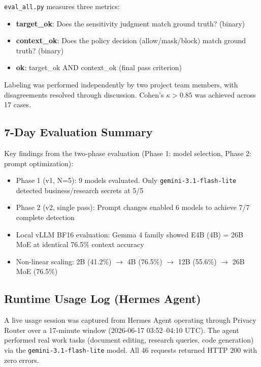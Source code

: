 \documentclass[11pt,a4paper]{article}
\begin{document}
\texttt{eval\_all.py} measures three metrics:

\begin{itemize}[nosep]
  \item \textbf{target\_ok}: Does the sensitivity judgment match ground truth? (binary)
  \item \textbf{context\_ok}: Does the policy decision (allow/mask/block) match ground truth? (binary)
  \item \textbf{ok}: target\_ok AND context\_ok (final pass criterion)
\end{itemize}

Labeling was performed independently by two project team members, with disagreements resolved through discussion. Cohen's $\kappa > 0.85$ was achieved across 17 cases.

\subsection{7-Day Evaluation Summary}

Key findings from the two-phase evaluation (Phase 1: model selection, Phase 2: prompt optimization):

\begin{itemize}[nosep]
  \item Phase 1 (v1, N=5): 9 models evaluated. Only \texttt{gemini-3.1-flash-lite} detected business/research secrets at 5/5
  \item Phase 2 (v2, single pass): Prompt changes enabled 6 models to achieve 7/7 complete detection
  \item Local vLLM BF16 evaluation: Gemma 4 family showed E4B (4B) = 26B MoE at identical 76.5\% context accuracy
  \item Non-linear scaling: 2B (41.2\%) $\rightarrow$ 4B (76.5\%) $\rightarrow$ 12B (55.6\%) $\rightarrow$ 26B MoE (76.5\%)
\end{itemize}

\subsection{Runtime Usage Log (Hermes Agent)}

A live usage session was captured from Hermes Agent operating through Privacy Router over a 17-minute window (2026-06-17 03:52--04:10 UTC). The agent performed real work tasks (document editing, research queries, code generation) via the \texttt{gemini-3.1-flash-lite} model. All 46 requests returned HTTP 200 with zero errors.
\end{document}
